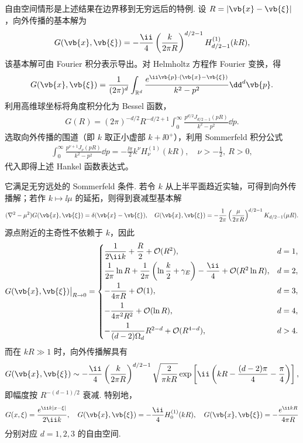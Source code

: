 自由空间情形是上述结果在边界移到无穷远后的特例. 设 \(R=\left|\vb{x}-\vb{\xi}\right|\)，向外传播的基本解为
\begin{align*}
	G(\vb{x},\vb{\xi})=-\frac{\ii}{4}\left(\frac{k}{2\pi R}\right)^{d/2-1}H_{d/2-1}^{(1)}(kR),
\end{align*}
该基本解可由 Fourier 积分表示导出。对 Helmholtz 方程作 Fourier 变换，得
\begin{align*}
	G(\vb{x},\vb{\xi})
	=\frac{1}{(2\pi)^d}\int_{\mathbb{R}^d}\frac{e^{\ii\vb{p}\cdot(\vb{x}-\vb{\xi})}}{k^2-p^2}\dd^d\vb{p}.
\end{align*}
利用高维球坐标将角度积分化为 Bessel 函数，
\begin{align*}
	G(R)
	=(2\pi)^{-d/2}R^{-d/2+1}\int_0^\infty\frac{p^{d/2}J_{d/2-1}(pR)}{k^2-p^2}\dd p.
\end{align*}
选取向外传播的围道（即 \(k\) 取正小虚部 \(k+\ii0^+\)），利用 Sommerfeld 积分公式
\begin{align*}
	\int_0^\infty\frac{p^{\nu+1}J_\nu(pR)}{k^2-p^2}\dd p
	=-\frac{\ii\pi}{2}k^\nu H_\nu^{(1)}(kR),\quad
	\nu>-\frac{1}{2},\ R>0,
\end{align*}
代入即得上述 Hankel 函数表达式。

它满足无穷远处的 Sommerfeld 条件. 若令 \(k\) 从上半平面趋近实轴，可得到向外传播解；若作 \(k\mapsto\ii\mu\) 的延拓，则得到衰减型基本解
\begin{align*}
	(\nabla^2-\mu^2)G(\vb{x},\vb{\xi})=\delta(\vb{x}-\vb{\xi}),
	\quad
	G(\vb{x},\vb{\xi})=-\frac{1}{2\pi}\left(\frac{\mu}{2\pi R}\right)^{d/2-1}K_{d/2-1}(\mu R).
\end{align*}
源点附近的主奇性不依赖于 \(k\)，因此
\begin{align*}
	G(\vb{x},\vb{\xi})\big|_{R\to0}=\begin{cases}
		\dfrac{1}{2\ii k}+\dfrac{R}{2}+\mathcal{O}(R^2), & d=1,\\[6pt]
		\dfrac{1}{2\pi}\ln R+\dfrac{1}{2\pi}\left(\ln\dfrac{k}{2}+\gamma_E\right)-\dfrac{\ii}{4}+\mathcal{O}(R^2\ln R), & d=2,\\[8pt]
		-\dfrac{1}{4\pi R}+\mathcal{O}(1), & d=3,\\[8pt]
		-\dfrac{1}{4\pi^2R^2}+\mathcal{O}(\ln R), & d=4,\\[8pt]
		-\dfrac{1}{(d-2)\Omega_d}R^{2-d}+\mathcal{O}(R^{4-d}), & d>4.
	\end{cases}
\end{align*}
而在 \(kR\gg1\) 时，向外传播解具有
\begin{align*}
	G(\vb{x},\vb{\xi})
	\sim -\frac{\ii}{4}\left(\frac{k}{2\pi R}\right)^{d/2-1}
	\sqrt{\frac{2}{\pi kR}}\exp\left[\ii\left(kR-\frac{(d-2)\pi}{4}-\frac{\pi}{4}\right)\right],
\end{align*}
即幅度按 \(R^{-(d-1)/2}\) 衰减. 特别地，
\begin{align*}
	G(x,\xi)=\frac{e^{\ii k|x-\xi|}}{2\ii k},\quad
	G(\vb{x},\vb{\xi})=-\frac{\ii}{4}H_0^{(1)}(kR),\quad
	G(\vb{x},\vb{\xi})=-\frac{e^{\ii kR}}{4\pi R}
\end{align*}
分别对应 \(d=1,2,3\) 的自由空间.

